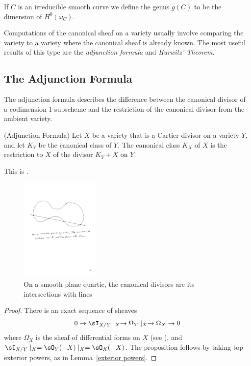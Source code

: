 \begin{definition}
If $C$ is an irreducible smooth curve we define the genus $g(C)$ to be the dimension of $H^0(\omega_C)$.
\end{definition}

Computations of the canonical sheaf on a variety usually involve comparing the variety to a variety where the canonical sheaf is already known. The most useful results of this type are  the \emph{adjunction formula}
and \emph{Hurwitz' Theorem}. 

\subsection{The Adjunction Formula}\label{Adjunction Formula}

The adjunction formula describes the difference between the canonical divisor of
a codimension 1 subscheme and the restriction of the canonical divisor from the ambient variety.

\begin{proposition}\label{adjunction}(Adjunction Formula)
 Let $X$ be a variety that is a Cartier divisor on a variety $Y$, and let $K_{Y}$ be the canonical class of $Y$. The canonical class $K_X$ of $X$ is
 the restriction to $X$ of the divisor $K_{Y}+X$ on $Y$.
\end{proposition}
This is \cite[Proposition 8.20]{Hartshorne1977}.

\begin{figure}
 \caption{On a smooth plane quartic, the canonical divisors are its intersections with lines}
\centerline {\includegraphics[height=2in]{"Fig2.1.pdf"}}
\end{figure}


\begin{proof}
 There is an exact sequence of sheaves
 $$
0\to  \sI_{X/Y}\mid_{X} \to \Omega_{Y}\mid _{X} \to \Omega_{X} \to 0
 $$
 where $\Omega_{X}$ is the sheaf of differential forms on $X$ (see \cite[Proposition 16.3]{Eisenbud95}), and
$ \sI_{X/Y}\mid_{X} = \sO_{Y}(-X)\mid_{X} = \sO_{X}(-X)$. The proposition follows by taking top exterior powers, 
as in Lemma~\ref{exterior powers}.\end{proof}

